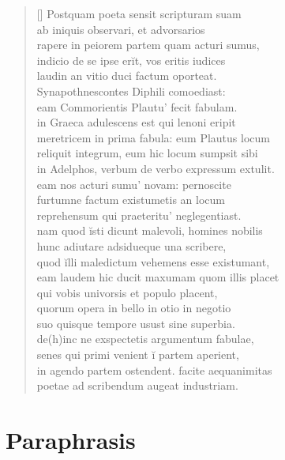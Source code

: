 \settowidth{\versewidth}{in agendo partem ostendent. facite aequanimitas}
\begin{verse}[\versewidth]
{\large
    Postquam poeta sensit scripturam suam\\
    ab iniquis observari, et advorsarios\\
    rapere in peiorem partem quam acturi sumus,\\
    indicio de se ipse erĭt, vos eritis iudices\\
    laudin an vitio duci factum oporteat.\\
    Synapothnescontes Diphili comoediast:\\
    eam Commorientis Plautu' fecit fabulam.\\
    in Graeca adulescens est qui lenoni eripit\\
    meretricem in prima fabula: eum Plautus locum\\
    reliquit integrum, eum hic locum sumpsit sibi\\
    in Adelphos, verbum de verbo expressum extulit.\\
    eam nos acturi sumu' novam: pernoscite\\
    furtumne factum existumetis an locum\\
    reprehensum qui praeteritu' neglegentiast.\\
    nam quod ĭsti dicunt malevoli, homines nobilis\\
    hunc adiutare adsidueque una scribere,\\
    quod ĭlli maledictum vehemens esse existumant,\\
    eam laudem hic ducit maxumam quom illis placet\\
    qui vobis univorsis et populo placent,\\
    quorum opera in bello in otio in negotio\\
    suo quisque tempore usust sine superbia.\\
    de(h)inc ne exspectetis argumentum fabulae,\\
    senes qui primi venient ĭ partem aperient,\\
    in agendo partem ostendent. facite aequanimitas\\
    poetae ad scribendum augeat industriam.\\
}
   
\end{verse}

\section*{Paraphrasis}

